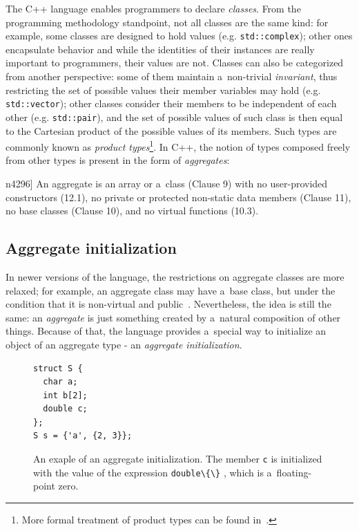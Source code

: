 \documentclass[nolot,nolof,nocover,printed]{fithesis3}
\newcommand{\stdN}[2]{\cite[#2]{#1}\xspace}
\begin{document}
The C++ language enables programmers to declare \textit{classes}. From the programming methodology standpoint, not all classes are the same kind: for example, some classes are designed to hold values (e.g. \lstinline|std::complex|); other ones encapsulate behavior and while the identities of their instances are really important to programmers, their values are not. Classes can also be categorized from another perspective: some of them maintain a~non-trivial \textit{invariant}, thus restricting the set of possible values their member variables may hold (e.g. \lstinline|std::vector|); other classes consider their members to be independent of each other (e.g. \lstinline|std::pair|), and the set of possible values of such class is then equal to the Cartesian product of the possible values of its members. Such types are commonly known as \textit{product types}\footnote{More formal treatment of product types can be found in~\cite[Chapter~1.5]{hottbook}.}. In C++, the notion of types composed freely from other types is present in the form of \textit{aggregates}:
\begin{displayquote}[\stdN{n4296}{\S 8.5.1/1}]
An aggregate is an array or a~class (Clause 9) with no user-provided constructors (12.1), no private or
protected non-static data members (Clause 11), no base classes (Clause 10), and no virtual functions (10.3).
\end{displayquote}

\subsection{Aggregate initialization}
In newer versions of the language, the restrictions on aggregate classes are more relaxed; for example, an aggregate class may have a~base class, but under the condition that it is non-virtual and public~\stdN{n4700}{\S 11.6.1/1}. Nevertheless, the idea is still the same: an \textit{aggregate} is just something created by a~natural composition of other things. Because of that, the language provides a~special way to initialize an object of an aggregate type - an \textit{aggregate initialization}.

\begin{figure}[ht]
\begin{lstlisting}
struct S {
  char a;
  int b[2];
  double c;
};
S s = {'a', {2, 3}};
\end{lstlisting}
\caption[Aggregate initialization.]{An exaple of an aggregate initialization. The member \lstinline|c| is initialized with the value of the expression \lstinline|double\{\}| , which is a~floating-point zero.}
\label{fig:aggrInit}
\end{figure}
\end{document}
